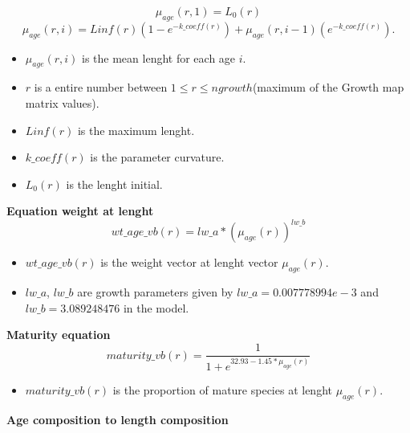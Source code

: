 \documentclass{article}
\begin{document}
\begin{equation}
    \mu_{age}(r,1)=L_0(r)
\end{equation}
\begin{equation}
    \mu_{age}(r,i)=Linf(r)(1-e^{-{k\_coeff(r)}})+\mu_{age}(r,i-1)(e^{-k\_{coeff(r)}}).
\end{equation}
 \begin{itemize}
    \item $\mu_{age}(r,i)$ is the mean lenght for each age $i$.
     \item $r$ is a entire number between $1\leq r \leq ngrowth$(maximum of the Growth map matrix values). 
     \item $Linf(r)$ is the maximum lenght.
     \item $k\_coeff(r)$ is the parameter curvature.
     \item $L_0(r)$ is the lenght initial.
     
 \end{itemize}
\textbf{Equation weight at lenght}\\
\begin{equation}
     wt\_age\_vb(r) = lw\_a * \left(\mu_{age}(r)\right)^{lw\_b}
 \end{equation}
 \begin{itemize}
     \item $wt\_age\_vb(r)$ is the weight vector at lenght vector $\mu_{age}(r)$.
     \item $lw\_a$, $lw\_b$ are growth parameters given by  $lw\_a=0.007778994e-3$ and $lw\_b=3.089248476$ in the model.
 \end{itemize}
 \textbf{Maturity equation}\\
 \begin{equation}
    maturity\_vb(r) = \dfrac{1}{1+e^{32.93-1.45*\mu_{age}(r)}}
\end{equation}
\begin{itemize}
    \item $maturity\_vb(r)$ is the proportion of mature species at lenght $\mu_{age}(r)$.
\end{itemize}
\textbf{Age composition to length composition}\\
\end{document}
